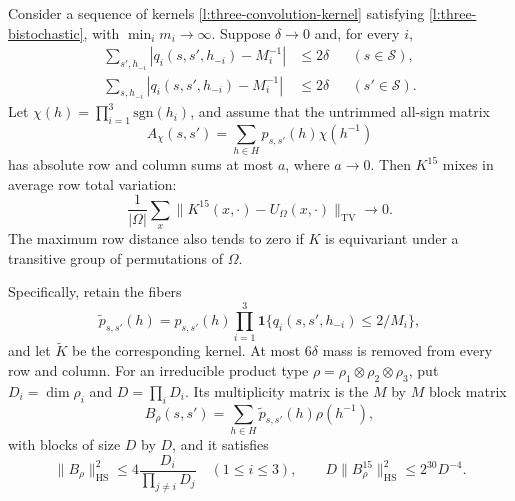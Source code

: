 \begin{theorem}
\label{l:three-group}
Consider a sequence of kernels \eqref{l:three-convolution-kernel}
satisfying \eqref{l:three-bistochastic}, with
$\min_i m_i\to\infty$.  Suppose $\delta\to0$ and, for every $i$,
\begin{align}
 \sum_{s',h_{-i}}|q_i(s,s',h_{-i})-M_i^{-1}|&\le2\delta
                                      &&(s\in\mathcal S),\label{l:three-row-input}\\
 \sum_{s,h_{-i}}|q_i(s,s',h_{-i})-M_i^{-1}|&\le2\delta
                                      &&(s'\in\mathcal S).\label{l:three-column-input}
\end{align}
Let $\chi(h)=\prod_{i=1}^3\mathrm{sgn}(h_i)$, and assume that the
untrimmed all-sign matrix
\[
 A_\chi(s,s')=\sum_{h\in H}p_{s,s'}(h)\chi(h^{-1})
\]
has absolute row and column sums at most $a$, where $a\to0$.
Then $K^{15}$ mixes in average row total variation:
\[
 \frac1{|\Omega|}\sum_x
       \|K^{15}(x,\cdot)-U_\Omega(x,\cdot)\|_{\mathrm{TV}}
 \longrightarrow0.
\]
The maximum row distance also tends to zero if $K$ is equivariant
under a transitive group of permutations of $\Omega$.

Specifically, retain the fibers
\begin{equation}
 \widetilde p_{s,s'}(h)=p_{s,s'}(h)
     \prod_{i=1}^3\mathbf1\{q_i(s,s',h_{-i})\le2/M_i\},
 \label{l:three-cutoff}
\end{equation}
and let $\widetilde K$ be the corresponding kernel.  At most
$6\delta$ mass is removed from every row and column.  For an
irreducible product type $\rho=\rho_1\otimes\rho_2\otimes\rho_3$,
put $D_i=\dim\rho_i$ and $D=\prod_iD_i$.  Its multiplicity matrix
is the $M$ by $M$ block matrix
\begin{equation}
 B_\rho(s,s')=\sum_{h\in H}\widetilde p_{s,s'}(h)\rho(h^{-1}),
 \label{l:three-fourier-block}
\end{equation}
with blocks of size $D$ by $D$, and it satisfies
\begin{equation}
 \|B_\rho\|_{\mathrm{HS}}^2
       \le4\frac{D_i}{\prod_{j\ne i}D_j}\quad(1\le i\le3),
 \qquad
 D\|B_\rho^{15}\|_{\mathrm{HS}}^2\le2^{30}D^{-4}.
 \label{l:three-type-bounds}
\end{equation}
\end{theorem}

